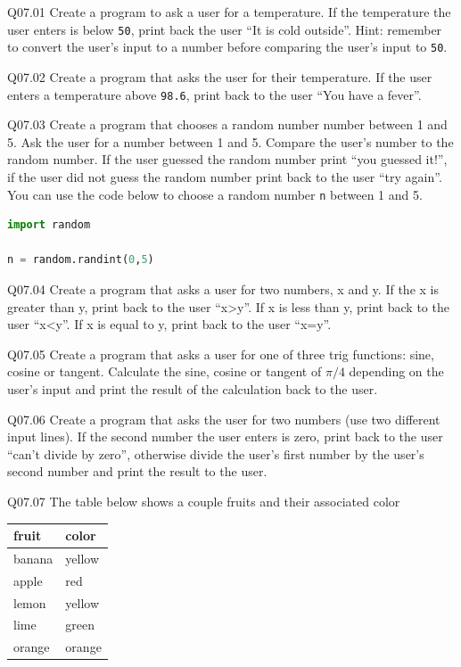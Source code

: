 \documentclass{book}
\newenvironment{problems}{}{}  %
\begin{document}
    
        \begin{problems}
        Q07.01 Create a program to ask a user for a temperature. If the
temperature the user enters is below \lstinline!50!, print back the user
``It is cold outside''. Hint: remember to convert the user's input to a
number before comparing the user's input to \lstinline!50!.

Q07.02 Create a program that asks the user for their temperature. If the
user enters a temperature above \lstinline!98.6!, print back to the user
``You have a fever''.

Q07.03 Create a program that chooses a random number number between 1
and 5. Ask the user for a number between 1 and 5. Compare the user's
number to the random number. If the user guessed the random number print
``you guessed it!'', if the user did not guess the random number print
back to the user ``try again''. You can use the code below to choose a
random number \lstinline!n! between 1 and 5.

\begin{lstlisting}[language=Python]
import random

n = random.randint(0,5)
\end{lstlisting}

Q07.04 Create a program that asks a user for two numbers, x and y. If
the x is greater than y, print back to the user ``x\textgreater{}y''. If
x is less than y, print back to the user ``x\textless{}y''. If x is
equal to y, print back to the user ``x=y''.

Q07.05 Create a program that asks a user for one of three trig
functions: sine, cosine or tangent. Calculate the sine, cosine or
tangent of \(\pi/4\) depending on the user's input and print the result
of the calculation back to the user.

Q07.06 Create a program that asks the user for two numbers (use two
different input lines). If the second number the user enters is zero,
print back to the user ``can't divide by zero'', otherwise divide the
user's first number by the user's second number and print the result to
the user.

Q07.07 The table below shows a couple fruits and their associated color

\begin{longtable}[]{@{}ll@{}}
\toprule
fruit & color\tabularnewline
\midrule
\endhead
banana & yellow\tabularnewline
apple & red\tabularnewline
lemon & yellow\tabularnewline
lime & green\tabularnewline
orange & orange\tabularnewline
\bottomrule
\end{longtable}


\end{problems}
\end{document}
